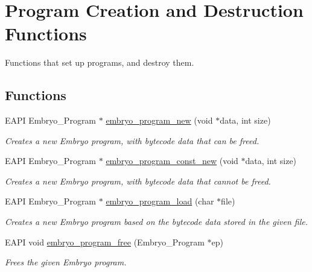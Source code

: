 \hypertarget{group__Embryo__Program__Creation__Group}{
\section{Program Creation and Destruction Functions}
\label{group__Embryo__Program__Creation__Group}
}
Functions that set up programs, and destroy them.  
\subsection*{Functions}
\begin{CompactItemize}
\item 
EAPI Embryo\_\-Program $\ast$ \hyperlink{group__Embryo__Program__Creation__Group_g235db2ba7ebad3eeb0b92bf8f5e6666e}{embryo\_\-program\_\-new} (void $\ast$data, int size)
\begin{CompactList}\small\item\em Creates a new Embryo program, with bytecode data that can be freed. \item\end{CompactList}\item 
EAPI Embryo\_\-Program $\ast$ \hyperlink{group__Embryo__Program__Creation__Group_ge3e58565672af272e613d4fbda20c769}{embryo\_\-program\_\-const\_\-new} (void $\ast$data, int size)
\begin{CompactList}\small\item\em Creates a new Embryo program, with bytecode data that cannot be freed. \item\end{CompactList}\item 
EAPI Embryo\_\-Program $\ast$ \hyperlink{group__Embryo__Program__Creation__Group_g9ea38e9210de74c017facd957c0e1a9f}{embryo\_\-program\_\-load} (char $\ast$file)
\begin{CompactList}\small\item\em Creates a new Embryo program based on the bytecode data stored in the given file. \item\end{CompactList}\item 
EAPI void \hyperlink{group__Embryo__Program__Creation__Group_g2f25a71ef9f2254882c841fbd5e0e68a}{embryo\_\-program\_\-free} (Embryo\_\-Program $\ast$ep)
\begin{CompactList}\small\item\em Frees the given Embryo program. \item\end{CompactList}\end{CompactItemize}


